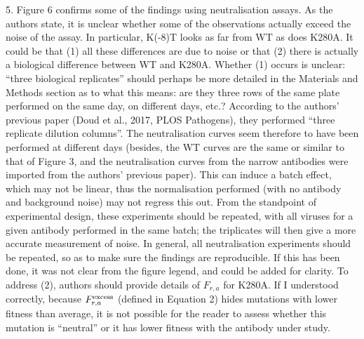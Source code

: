 \documentclass[11pt, oneside]{article}   	%
\begin{document}
5. Figure 6 confirms some of the findings using neutralisation assays. As the authors state, it is unclear whether some of the observations actually exceed the noise of the assay. In particular, K(-8)T looks as far from WT as does K280A. It could be that (1) all these differences are due to noise or that (2) there is actually a biological difference between WT and K280A. Whether (1) occurs is unclear: ``three biological replicates'' should perhaps be more detailed in the Materials and Methods section as to what this means: are they three rows of the same plate performed on the same day, on different days, etc.? According to the authors' previous paper (Doud et al., 2017, PLOS Pathogens), they performed ``three replicate dilution columns''. The neutralisation curves seem therefore to have been performed at different days (besides, the WT curves are the same or similar to that of Figure 3, and the neutralisation curves from the narrow antibodies were imported from the authors' previous paper). This can induce a batch effect, which may not be linear, thus the normalisation performed (with no antibody and background noise) may not regress this out. From the standpoint of experimental design, these experiments should be repeated, with all viruses for a given antibody performed in the same batch; the triplicates will then give a more accurate measurement of noise. In general, all neutralisation experiments should be repeated, so as to make sure the findings are reproducible. If this has been done, it was not clear from the figure legend, and could be added for clarity. To address (2), authors should provide details of $F_{r,a}$ for K280A. If I understood correctly, because $F_{r,a}^{\rm{excess}}$ (defined in Equation 2) hides mutations with lower fitness than average, it is not possible for the reader to assess whether this mutation is ``neutral'' or it has lower fitness with the antibody under study. 
\end{document}
